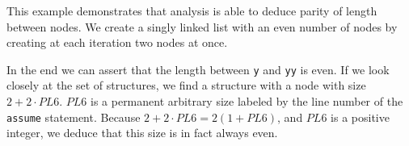 This example demonstrates that analysis is able to deduce parity of length between nodes. We create a singly linked list with an even number of nodes by creating at each iteration two nodes at once.

In the end we can assert that the length between \texttt{y} and \texttt{yy} is even. If we look closely at the set of structures, we find a structure with a node with size $2 + 2\cdot PL6$. $PL6$ is a permanent arbitrary size labeled by the line number of the \texttt{assume} statement. Because $2+2\cdot PL6 = 2(1+PL6)$, and $PL6$ is a positive integer, we deduce that this size is in fact always even.
